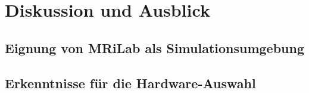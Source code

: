 \chapter{Diskussion und Ausblick}

\section{Eignung von MRiLab als Simulationsumgebung}

\section{Erkenntnisse für die Hardware-Auswahl}
